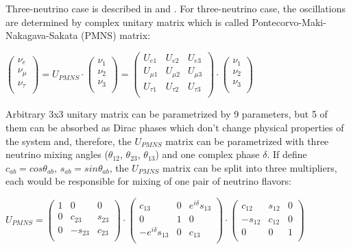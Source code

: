 Three-neutrino case is described in \cite{ref_theory_Osc} and \cite{ref_LBNF_CDR}. For three-neutrino case, the oscillations are determined by complex unitary matrix which is called Pontecorvo-Maki-Nakagava-Sakata (PMNS) matrix:\\
\begin{center}
$ \begin{pmatrix} \nu_{e} \\ \nu_{\mu} \\ \nu_{\tau} \\ \end{pmatrix}
 = U_{PMNS}\cdot \begin{pmatrix} \nu_{1} \\ \nu_{2} \\ \nu_{3} \\ \end{pmatrix} = 
 \begin{pmatrix}
  U_{e1} & U_{e2} & U_{e3} \\
  U_{\mu1} & U_{\mu2} & U_{\mu3} \\
  U_{\tau1} & U_{\tau2} & U_{\tau3} \\
 \end{pmatrix}
 \cdot
\begin{pmatrix} \nu_{1} \\ \nu_{2} \\ \nu_{3} \\ \end{pmatrix}$\\
\end{center}

Arbitrary 3x3 unitary matrix can be parametrized by 9 parameters, but 5 of them can be absorbed as Dirac phases which don't change physical properties of the system and, therefore, the $U_{PMNS}$ matrix can be parametrized with three neutrino mixing angles ($\theta_{12}$, $\theta_{23}$, $\theta_{13}$) and one complex phase $\delta$. If define $c_{ab}=cos\theta_{ab}$, $s_{ab}=sin\theta_{ab}$, the $U_{PMNS}$ matrix can be split into three multipliers, each would be responsible for mixing of one pair of neutrino flavors:\\
\begin{center}
$U_{PMNS} =
 \begin{pmatrix}
  1 & 0 & 0 \\
  0 & c_{23} & s_{23} \\
  0 & -s_{23} & c_{23} \\
 \end{pmatrix}
 \cdot
 \begin{pmatrix}
  c_{13} & 0 & e^{i\delta}s_{13} \\
  0 & 1 & 0 \\
  -e^{i\delta}s_{13} & 0 & c_{13} \\
 \end{pmatrix}
 \cdot
 \begin{pmatrix}
  c_{12} & s_{12} & 0 \\
  -s_{12} & c_{12} & 0 \\
  0 & 0 & 1 \\
 \end{pmatrix}$ \\
\end{center}

